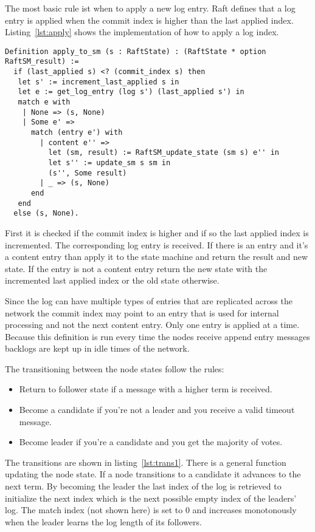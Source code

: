 The most basic rule ist when to apply a new log entry.
Raft defines that a log entry is applied when the commit index
is higher than the last applied index. Listing~\ref{lst:apply} shows
the implementation of how to apply a log index. 

\begin{lstlisting}[style=coq,label=lst:apply,
caption=How a log is applied to the local state machine.]
Definition apply_to_sm (s : RaftState) : (RaftState * option RaftSM_result) :=
  if (last_applied s) <? (commit_index s) then 
   let s' := increment_last_applied s in 
   let e := get_log_entry (log s') (last_applied s') in
   match e with
    | None => (s, None) 
    | Some e' => 
      match (entry e') with
        | content e'' => 
          let (sm, result) := RaftSM_update_state (sm s) e'' in
          let s'' := update_sm s sm in
          (s'', Some result)
        | _ => (s, None) 
      end
   end
  else (s, None). 
\end{lstlisting}

First it is checked if the commit index is higher and if so the last
applied index is incremented. The corresponding log entry is received.
If there is an entry and it's a content entry than apply it to the
state machine and return the result and new state. 
If the entry is not a content entry return the new
state with the incremented last applied index or the old state otherwise.

Since the log can have multiple types of entries that are replicated
across the network the commit index may point to an entry that
is used for internal processing and not the next content entry.
Only one entry is applied at a time. Because this definition is run
every time the nodes receive append entry messages backlogs are kept up
in idle times of the network.

The transitioning between the node states follow the rules:
\begin{itemize}
  \item Return to follower state if a message with a higher term is received.
  \item Become a candidate if you're not a leader and you receive a valid
    timeout message.
  \item Become leader if you're a candidate and you get the majority
    of votes.
\end{itemize}

The transitions are shown in listing~\ref{lst:trans1}. There is a general
function updating the node state. If a node transitions to a candidate
it advances to the next term. By becoming the leader the last index of
the log is retrieved to initialize the next index which is the next possible
empty index of the leaders' log. The match index (not shown here) is
set to 0 and increases monotonously when the leader learns the
log length of its followers. 

